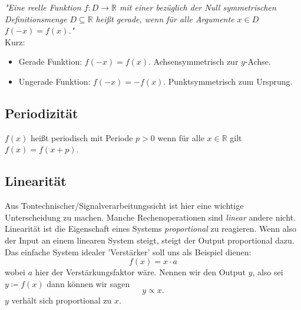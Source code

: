 \emph{"Eine reelle Funktion $f\colon D\to \mathbb {R} $ mit einer bezüglich der Null symmetrischen Definitionsmenge 
$ D\subseteq \mathbb {R}$ heißt gerade, wenn für alle Argumente $ x\in D$  $f(-x)=f(x)$."} \\

Kurz:
\begin{itemize}
    \item Gerade Funktion:  $f(-x) = f(x)$. Achsensymmetrisch zur $y$-Achse.
    \item Ungerade Funktion:  $f(-x) = -f(x)$. Punktsymmetrisch zum Ursprung.
\end{itemize}





\subsection{Periodizität}
$f(x)$ heißt periodisch mit Periode $p>0$ wenn für alle $ x \in \mathbb{R}$ gilt $f(x) = f(x+p)$.

\subsection{Linearität}
Aus Tontechnischer/Signalverarbeitungssicht ist hier eine wichtige Unterscheidung zu machen. Manche Rechenoperationen sind \emph{linear} andere nicht. 
Linearität ist die Eigenschaft eines Systems \emph{proportional} zu reagieren.
Wenn also der Input an einem linearen System steigt, steigt der Output proportional dazu. Das einfache System idealer 'Verstärker' soll uns als Beispiel dienen:
$$f(x) = x \cdot a$$ wobei $a$ hier der Verstärkungsfaktor wäre. Nennen wir den Output $y$, also sei $y \coloneqq f(x)$ dann können wir sagen $$y \propto x.$$ 
$y$ verhält sich proportional zu $x$. 

